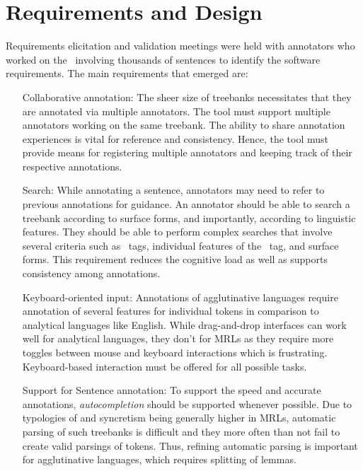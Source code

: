 \section{Requirements and Design}
\label{sec:requirements}


Requirements elicitation and validation meetings were held with annotators who worked on the \bountreebank\ involving thousands of sentences to identify the software requirements.
The main requirements that emerged are:
\begin{itemize}[before=\normalfont, font=\itshape, align=left,noitemsep,topsep=0pt,parsep=3pt,partopsep=0pt,labelsep=3pt,align=left]
    \item[Collaborative annotation:]
        The sheer size of treebanks necessitates that they are annotated via multiple annotators.
        The tool must support multiple annotators working on the same treebank.
        The ability to share annotation experiences is vital for reference and consistency.
        Hence, the tool must provide means for registering multiple annotators and keeping track of their respective annotations.
    \item[Search:]
        While annotating a sentence, annotators may need to refer to previous annotations for guidance.
        An annotator should be able to search a treebank according to surface forms, and importantly, according to linguistic features.
        They should be able to perform complex searches that involve several criteria such as \ud\ tags, individual features of the \feats\ tag, and surface forms.
        This requirement reduces the cognitive load as well as supports consistency among annotations.
    \item[Keyboard-oriented input:]
        Annotations of agglutinative languages require annotation of several features for individual tokens in comparison to analytical languages like English.
        While drag-and-drop interfaces can work well for analytical languages, they don't for MRLs as they require more toggles between mouse and keyboard interactions which is frustrating.
        Keyboard-based interaction must be offered for all possible tasks.
    \item[Support for Sentence annotation:]
        To support the speed and accurate annotations, \textit{autocompletion} should be supported whenever possible.
        Due to typologies of and syncretism being generally higher in MRLs, automatic parsing of such treebanks is difficult and they more often than not fail to create valid parsings of tokens.
        Thus, refining automatic parsing is important for agglutinative languages, which requires splitting of lemmas.

\end{itemize}
